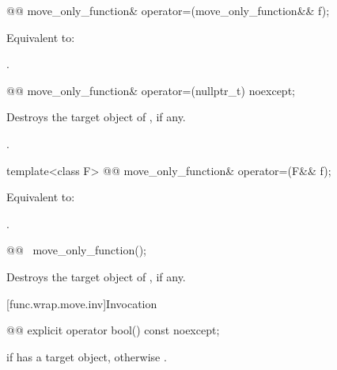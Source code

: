%
\begin{itemdecl}
@@ move_only_function& operator=(move_only_function&& f);
\end{itemdecl}

\begin{itemdescr}
\pnum
\effects
Equivalent to: 

\pnum
\returns
{}.
\end{itemdescr}

%
\begin{itemdecl}
@@ move_only_function& operator=(nullptr_t) noexcept;
\end{itemdecl}

\begin{itemdescr}
\pnum
\effects
Destroys the target object of , if any.

\pnum
\returns
{}.
\end{itemdescr}

%
\begin{itemdecl}
template<class F> @@ move_only_function& operator=(F&& f);
\end{itemdecl}

\begin{itemdescr}
\pnum
\effects
Equivalent to: 

\pnum
\returns
{}.
\end{itemdescr}

%
\begin{itemdecl}
@@ ~move_only_function();
\end{itemdecl}

\begin{itemdescr}
\pnum
\effects
Destroys the target object of , if any.
\end{itemdescr}

[func.wrap.move.inv]{Invocation}

%
\begin{itemdecl}
@@ explicit operator bool() const noexcept;
\end{itemdecl}

\begin{itemdescr}
\pnum
\returns
{} if  has a target object, otherwise .
\end{itemdescr}

